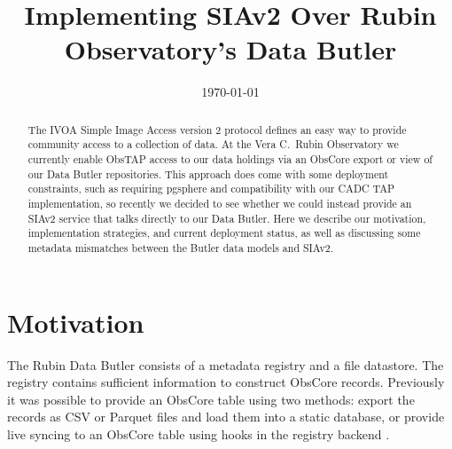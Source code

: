 \documentclass[11pt,twoside]{article}
\begin{document}

\date{\today}
\title{Implementing SIAv2 Over Rubin Observatory's Data Butler}



\begin{abstract}
The IVOA Simple Image Access version 2 protocol defines an easy way to provide community access to a collection of data.
At the Vera C.\ Rubin Observatory we currently enable ObsTAP access to our data holdings via an ObsCore export or view of our Data Butler repositories.
This approach does come with some deployment constraints, such as requiring pgsphere and compatibility with our CADC TAP implementation, so recently we decided to see whether we could instead provide an SIAv2 service that talks directly to our Data Butler.
Here we describe our motivation, implementation strategies, and current deployment status, as well as discussing some metadata mismatches between the Butler data models and SIAv2.
\end{abstract}



\section{Motivation}

The Rubin Data Butler \citep{2022SPIE12189E..11J} consists of a metadata registry and a file datastore.
The registry contains sufficient information to construct ObsCore records.
Previously it was possible to provide an ObsCore table using two methods: export the records as CSV or Parquet files and load them into a static database, or provide live syncing to an ObsCore table using hooks in the registry backend \citep{DMTN-236}.
\end{document}
